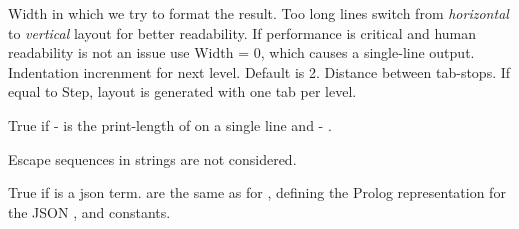 \documentclass[11pt]{article}
\begin{document}
\begin{description}
\begin{description}
Width in which we try to format the result. Too long lines
switch from \textit{horizontal} to \textit{vertical} layout for better
readability. If performance is critical and human
readability is not an issue use Width = 0, which causes a
single-line output.
Indentation increnment for next level. Default is 2.
Distance between tab-stops. If equal to Step, layout
is generated with one tab per level.
\end{description}

True if - is the print-length of  on a single line
and - \Sle{} .

\begin{tags}
Escape sequences in strings are not considered.
\end{tags}

\nodescription
True if  is a json term.  are the same as for
, defining the Prolog representation for the JSON
,  and  constants.
\end{description}


\printindex
\end{document}
